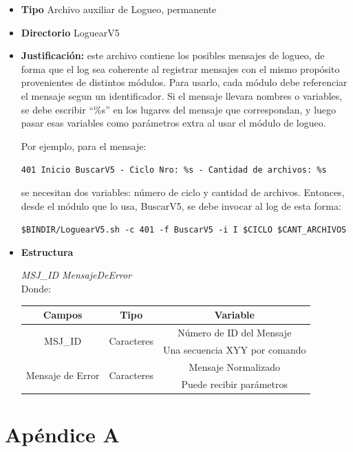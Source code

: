 \documentclass[a4paper,10pt,titlepage]{article}
\begin{document}
			\begin {itemize}
				\item \textbf{Tipo} {Archivo auxiliar de Logueo, permanente}
				\item \textbf{Directorio} {LoguearV5}
				 \item \textbf{Justificación:}  este archivo contiene los posibles mensajes de logueo, de forma que el log sea coherente al registrar mensajes con el mismo propósito provenientes de distintos módulos. Para usarlo, cada módulo debe referenciar el mensaje segun un identificador. Si el mensaje llevara nombres o variables, se debe escribir ``\%s'' en los lugares del mensaje que correspondan, y luego pasar esas variables como parámetros extra al usar el módulo de logueo.


				Por ejemplo, para el mensaje:

				{\tt 401 Inicio BuscarV5 - Ciclo Nro: \%s - Cantidad de archivos: \%s}

				se necesitan dos variables: número de ciclo y cantidad de archivos. Entonces, desde el módulo que lo usa, BuscarV5, se debe invocar al log de esta forma:

				{\tt \$BINDIR/LoguearV5.sh -c 401 -f BuscarV5 -i I \$CICLO \$CANT\_ARCHIVOS}

				\item \textbf{Estructura} {\textit{MSJ\_ID MensajeDeError}\\
					Donde: \ 
					\begin{table}[H]
					\centering
					\begin{tabular}{| c | c | c |}
						\hline
						Campos 	& Tipo & Variable\\
						\hline
						\multirow{2}{*}{MSJ\_ID } & \multirow{2}{*}{Caracteres} & Número de ID del Mensaje\\
						{} & {} & Una secuencia XYY por comando \\
						\hline 
						\multirow{2}{*}{Mensaje de Error} & \multirow{2}{*}{Caracteres} & Mensaje Normalizado \\ 
						{} & {} &  Puede recibir parámetros \\
						\hline
					\end{tabular}
					\end{table}
				}
			\end{itemize}


\newpage

\section{Ap\'endice A}
\end{document}
